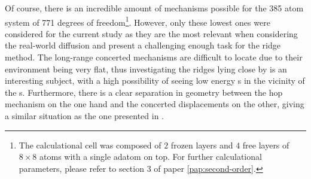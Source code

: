 Of course, there is an incredible amount of mechanisms possible for the 385 atom system of 771 degrees of freedom\footnote{The calculational cell was composed of $2$ frozen layers and $4$ free layers of $8\times 8$ atoms with a single adatom on top. For further calculational parameters, please refer to section 3 of paper \ref{pap:second-order}.}.
However, only these lowest ones were considered for the current study as they are the most relevant when considering the real-world diffusion and present a challenging enough task for the ridge method.
The long-range concerted mechanisms are difficult to locate due to their environment being very flat, thus investigating the ridges lying close by is an interesting subject, with a high possibility of seeing low energy s in the vicinity of the s.
Furthermore, there is a clear separation in geometry between the hop mechanism on the one hand and the concerted displacements on the other, giving a similar situation as the one presented in .
